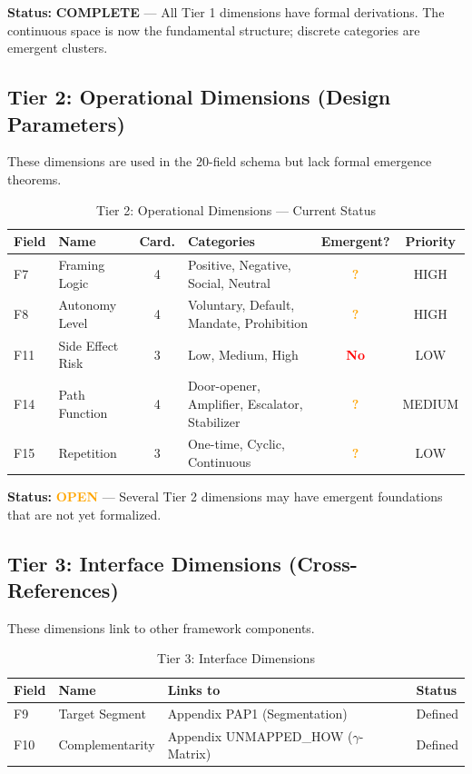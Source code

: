 \textbf{Status:} \textcolor{green!60!black}{\textbf{COMPLETE}} --- All Tier 1 dimensions have formal derivations. The continuous space is now the fundamental structure; discrete categories are emergent clusters.

\subsection{Tier 2: Operational Dimensions (Design Parameters)}

These dimensions are used in the 20-field schema but lack formal emergence theorems.

\begin{table}[htbp]
\centering
\caption{Tier 2: Operational Dimensions --- Current Status}
\label{tab:hhh-tier2}
\renewcommand{\arraystretch}{1.3}
\small
\begin{tabular}{@{}llclcc@{}}
\toprule
\textbf{Field} & \textbf{Name} & \textbf{Card.} & \textbf{Categories} & \textbf{Emergent?} & \textbf{Priority} \\
\midrule
F7 & Framing Logic & 4 & Positive, Negative, Social, Neutral & \textcolor{orange}{\textbf{?}} & HIGH \\
F8 & Autonomy Level & 4 & Voluntary, Default, Mandate, Prohibition & \textcolor{orange}{\textbf{?}} & HIGH \\
F11 & Side Effect Risk & 3 & Low, Medium, High & \textcolor{red}{\textbf{No}} & LOW \\
F14 & Path Function & 4 & Door-opener, Amplifier, Escalator, Stabilizer & \textcolor{orange}{\textbf{?}} & MEDIUM \\
F15 & Repetition & 3 & One-time, Cyclic, Continuous & \textcolor{orange}{\textbf{?}} & LOW \\
\bottomrule
\end{tabular}
\end{table}

\textbf{Status:} \textcolor{orange}{\textbf{OPEN}} --- Several Tier 2 dimensions may have emergent foundations that are not yet formalized.

\subsection{Tier 3: Interface Dimensions (Cross-References)}

These dimensions link to other framework components.

\begin{table}[htbp]
\centering
\caption{Tier 3: Interface Dimensions}
\label{tab:hhh-tier3}
\renewcommand{\arraystretch}{1.3}
\begin{tabular}{@{}llll@{}}
\toprule
\textbf{Field} & \textbf{Name} & \textbf{Links to} & \textbf{Status} \\
\midrule
F9 & Target Segment & Appendix PAP1 (Segmentation) & \textcolor{green!60!black}{Defined} \\
F10 & Complementarity & Appendix UNMAPPED_HOW ($\gamma$-Matrix) & \textcolor{green!60!black}{Defined} \\
\bottomrule
\end{tabular}
\end{table}

